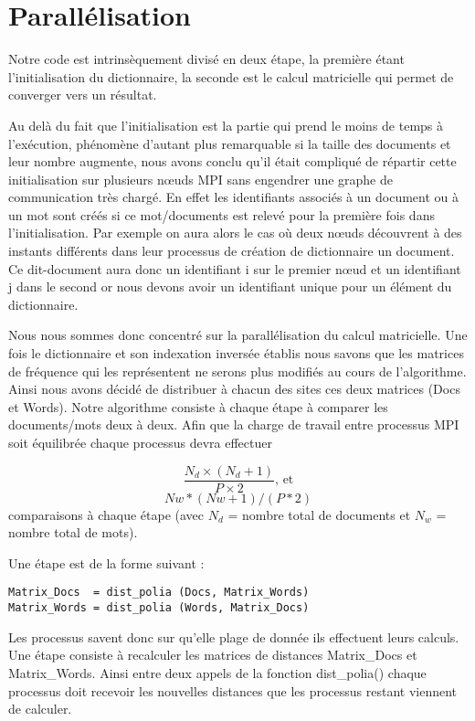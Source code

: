 \section{Parallélisation}

Notre code est intrinsèquement divisé en deux étape, la première étant l'initialisation du
dictionnaire, la seconde est le calcul matricielle qui permet de converger vers un résultat.

Au delà du fait que l'initialisation est la partie qui prend le moins de temps à l'exécution,
phénomène d'autant plus remarquable si la taille des documents et leur nombre augmente, nous
avons conclu qu'il était compliqué de répartir cette initialisation sur plusieurs nœuds MPI sans
engendrer une graphe de communication très chargé. En effet les identifiants associés à un
document ou à un mot sont créés si ce mot/documents est relevé pour la première fois dans
l'initialisation. Par exemple on aura alors le cas où deux nœuds découvrent à des instants
différents dans leur processus de création de dictionnaire un document. Ce dit-document aura donc
un identifiant i sur le premier nœud et un identifiant j dans le second or nous devons avoir un
identifiant unique pour un élément du dictionnaire.

Nous nous sommes donc concentré sur la parallélisation du calcul matricielle. Une fois le
dictionnaire et son indexation inversée établis nous savons que les matrices de fréquence qui les
représentent ne serons plus modifiés au cours de l'algorithme. Ainsi nous avons décidé de
distribuer à chacun des sites ces deux matrices (Docs et Words). Notre algorithme consiste à
chaque étape à comparer les documents/mots deux à deux. Afin que la charge de travail entre
processus MPI soit équilibrée chaque processus devra effectuer

\[ \frac{N_d \times (N_d+1)}{P \times 2}\mbox{, et} \]
\[ Nw*(Nw+1)/(P*2) \]
comparaisons à chaque étape (avec $N_d$ = nombre total de documents et $N_w$ = nombre
total de mots).

Une étape est de la forme suivant :

\begin{verbatim}
Matrix_Docs  = dist_polia (Docs, Matrix_Words)
Matrix_Words = dist_polia (Words, Matrix_Docs)
\end{verbatim}

Les processus savent donc sur qu'elle plage de donnée ils effectuent leurs calculs. Une
étape consiste à recalculer les matrices de distances Matrix\_Docs et Matrix\_Words. Ainsi entre
deux appels de la fonction dist\_polia() chaque processus doit recevoir les nouvelles distances que
les processus restant viennent de calculer.
